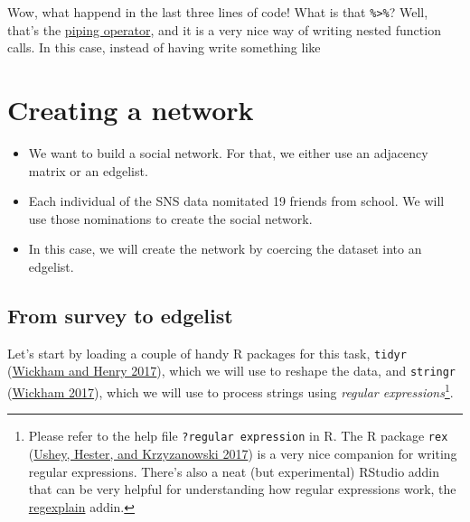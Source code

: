 \documentclass[
]{book}
\newenvironment{Shaded}{\begin{snugshade}}{\end{snugshade}}
\newcommand{\AttributeTok}[1]{\textcolor[rgb]{0.77,0.63,0.00}{#1}}
\newcommand{\DecValTok}[1]{\textcolor[rgb]{0.00,0.00,0.81}{#1}}
\newcommand{\FunctionTok}[1]{\textcolor[rgb]{0.00,0.00,0.00}{#1}}
\newcommand{\NormalTok}[1]{#1}
\newcommand{\OtherTok}[1]{\textcolor[rgb]{0.56,0.35,0.01}{#1}}
\newcommand{\SpecialCharTok}[1]{\textcolor[rgb]{0.00,0.00,0.00}{#1}}
\begin{document}
Wow, what happend in the last three lines of code! What is that \texttt{\%\textgreater{}\%}? Well, that's the \href{http://r4ds.had.co.nz/pipes.html}{piping operator}, and it is a very nice way of writing nested function calls. In this case, instead of having write something like

\begin{Shaded}
\end{Shaded}

\hypertarget{creating-a-network}{%
\section{Creating a network}\label{creating-a-network}}

\begin{itemize}
\item
  We want to build a social network. For that, we either use an adjacency matrix or an edgelist.
\item
  Each individual of the SNS data nomitated 19 friends from school. We will use those nominations to create the social network.
\item
  In this case, we will create the network by coercing the dataset into an edgelist.
\end{itemize}

\hypertarget{from-survey-to-edgelist}{%
\subsection{From survey to edgelist}\label{from-survey-to-edgelist}}

Let's start by loading a couple of handy R packages for this task, \texttt{tidyr} (\protect\hyperlink{ref-R-tidyr}{Wickham and Henry 2017}), which we will use to reshape the data, and \texttt{stringr} (\protect\hyperlink{ref-R-stringr}{Wickham 2017}), which we will use to process strings using \emph{regular expressions}\footnote{Please refer to the help file \texttt{?\textquotesingle{}regular\ expression\textquotesingle{}} in R. The R package \texttt{rex} (\protect\hyperlink{ref-R-rex}{Ushey, Hester, and Krzyzanowski 2017}) is a very nice companion for writing regular expressions. There's also a neat (but experimental) RStudio addin that can be very helpful for understanding how regular expressions work, the \href{https://github.com/gadenbuie/regexplain}{regexplain} addin.}.
\end{document}
